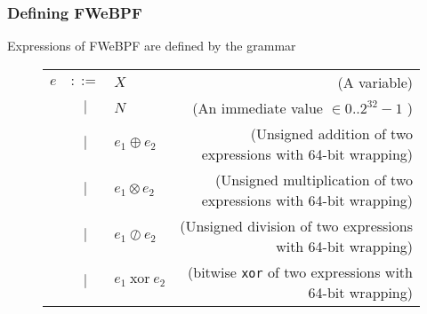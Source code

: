 



\subsubsection{Defining FWeBPF}


Expressions of FWeBPF are defined by the grammar
\begin{figure}[H]
  \centering
  \begin{tabular}{lclr}
    $e$ & $::=$ & $X$ & (A variable) \\
      & $|$ & $N$ & (An immediate value $\in 0..2^{32}-1$ ) \\
      & $|$ & $e_1 \oplus e_2$ & (Unsigned addition of two expressions with 64-bit wrapping) \\    
      & $|$ & $e_1 \otimes e_2$ & (Unsigned multiplication of two expressions with 64-bit wrapping) \\    
      & $|$ & $e_1 \oslash e_2$ & (Unsigned division of two expressions with 64-bit wrapping) \\
      & $|$ & $e_1 ~ \mathrm{xor} ~ e_2$ & (bitwise \texttt{xor} of two expressions with 64-bit wrapping) \\        
\end{tabular}    
\end{figure}


